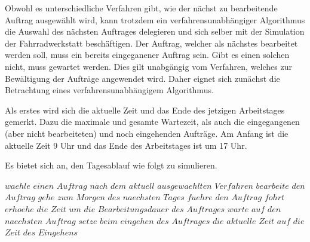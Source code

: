 \documentclass[a4paper,10pt,ngerman]{scrartcl}
\begin{document}
Obwohl es unterschiedliche Verfahren gibt,
wie der nächst zu bearbeitende Auftrag ausgewählt wird,
kann trotzdem ein verfahrensunabhängiger Algorithmus
die Auswahl des nächsten Auftrages delegieren
und sich selber mit der Simulation der Fahrradwerkstatt beschäftigen.
Der Auftrag, welcher als nächstes bearbeitet werden soll,
muss ein bereits eingeganener Auftrag sein.
Gibt es einen solchen nicht, muss gewartet werden.
Dies gilt unabgängig vom Verfahren,
welches zur Bewältigung der Aufträge angewendet wird.
Daher eignet sich zunächst
die Betrachtung eines verfahrensunabhängigem Algorithmus.

Als erstes wird sich die aktuelle Zeit
und das Ende des jetzigen Arbeitstages gemerkt.
Dazu die maximale und gesamte Wartezeit,
als auch die eingegangenen (aber nicht bearbeiteten) und noch eingehenden Aufträge.
Am Anfang ist die aktuelle Zeit 9 Uhr
und das Ende des Arbeitstages ist um 17 Uhr.

Es bietet sich an, den Tagesablauf wie folgt zu simulieren.
\begin{algorithmic}
\State $waehle$ $einen$ $Auftrag$ $nach$ $dem$ $aktuell$ $ausgewaehlten$ $Verfahren$
\State $bearbeite$ $den$ $Auftrag$
\State $gehe$ $zum$ $Morgen$ $des$ $naechsten$ $Tages$
\State $fuehre$ $den$ $Auftrag$ $fohrt$
\EndIf
\EndWhile
\State $erhoehe$ $die$ $Zeit$ $um$ $die$ $Bearbeitungsdauer$ $des$ $Auftrages$
\State $warte$ $auf$ $den$ $naechsten$ $Auftrag$
\State $setze$ $beim$ $eingehen$ $des$ $Auftrages$ $die$ $aktuelle$ $Zeit$ $auf$ $die$ $Zeit$ $des$ $Eingehens$
\EndIf
\EndWhile
\end{algorithmic}
\end{document}
